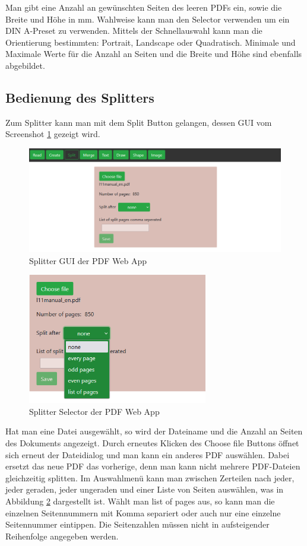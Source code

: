 Man gibt eine Anzahl an gewünschten Seiten des leeren PDFs ein, sowie die Breite und Höhe in mm. Wahlweise kann man den Selector verwenden um ein DIN A-Preset zu verwenden. Mittels der Schnellauswahl kann man die Orientierung bestimmten: Portrait, Landscape oder Quadratisch. Minimale und Maximale Werte für die Anzahl an Seiten und die Breite und Höhe sind ebenfalls abgebildet. 


\subsection{Bedienung des Splitters}
Zum Splitter kann man mit dem Split Button gelangen, dessen GUI vom Screenshot \ref{fig:splitter} gezeigt wird.

\begin{figure}[!htbp]
	\centering
	\includegraphics[width=1\textwidth]{"images/splitter.png"}
	\caption{Splitter GUI der PDF Web App}
	\label{fig:splitter}
\end{figure}

\begin{figure}[!htbp]
	\centering
	\includegraphics[width=0.7\textwidth]{"images/splitter2.png"}
	\caption{Splitter Selector der PDF Web App}
	\label{fig:splitter2}
\end{figure}

Hat man eine Datei ausgewählt, so wird der Dateiname und die Anzahl an Seiten des Dokuments angezeigt. Durch erneutes Klicken des Choose file Buttons öffnet sich erneut der Dateidialog und man kann ein anderes PDF auswählen. Dabei ersetzt das neue PDF das vorherige, denn man kann nicht mehrere PDF-Dateien gleichzeitig splitten. Im Auswahlmenü kann man zwischen Zerteilen nach jeder, jeder geraden, jeder ungeraden und einer Liste von Seiten auswählen, was in Abbildung \ref{fig:splitter2} dargestellt ist. Wählt man list of pages aus, so kann man die einzelnen Seitennummern mit Komma separiert oder auch nur eine einzelne Seitennummer eintippen. Die Seitenzahlen müssen nicht in aufsteigender Reihenfolge angegeben werden. 


